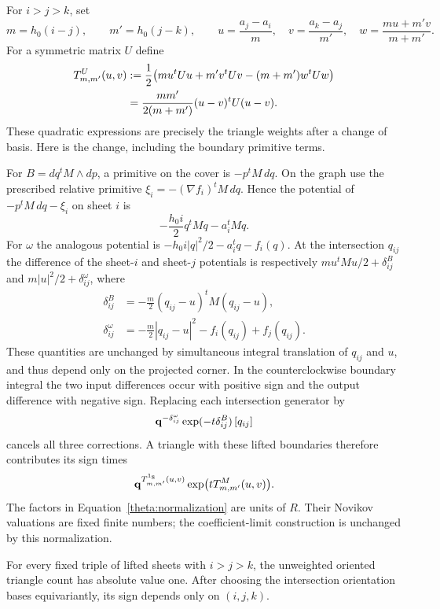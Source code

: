 For $i>j>k$, set
\[
 m=h_0(i-j),\qquad m'=h_0(j-k),\qquad
 u=\frac{a_j-a_i}{m},\quad v=\frac{a_k-a_j}{m'},\quad
 w=\frac{mu+m'v}{m+m'}.
\]
For a symmetric matrix $U$ define
\begin{align}
 T^U_{m,m'}(u,v)
 &:=\frac12\bigl(mu^tUu+m'v^tUv-(m+m')w^tUw\bigr)\notag\\
 &=\frac{mm'}{2(m+m')}(u-v)^tU(u-v).
 \label{theta:quadratic}
\end{align}
These quadratic expressions are precisely the triangle weights after a
change of basis.  Here is the change, including the boundary primitive
terms.

For $B=dq^tM\wedge dp$, a primitive on the cover is $-p^tM\,dq$.
On the graph use the prescribed relative primitive
$\xi_i=-(\nabla f_i)^tM\,dq$.  Hence the potential of
$-p^tM\,dq-\xi_i$ on sheet $i$ is
\[
 -\frac{h_0i}{2}q^tMq-a_i^tMq.
\]
For $\omega$ the analogous potential is
$-h_0i|q|^2/2-a_i^tq-f_i(q)$.  At the intersection $q_{ij}$ the difference
of the sheet-$i$ and sheet-$j$ potentials is respectively
$mu^tMu/2+\delta^B_{ij}$ and $m|u|^2/2+\delta^\omega_{ij}$, where
\begin{equation}\label{theta:corner-corrections}
 \begin{split}
 \delta^B_{ij}&=-\frac m2(q_{ij}-u)^tM(q_{ij}-u),\\
 \delta^\omega_{ij}&=-\frac m2|q_{ij}-u|^2-f_i(q_{ij})+f_j(q_{ij}).
 \end{split}
\end{equation}
These quantities are unchanged by simultaneous integral translation of
$q_{ij}$ and $u$, and thus depend only on the projected corner.  In the
counterclockwise boundary integral the two input differences occur with
positive sign and the output difference with negative sign.  Replacing
each intersection generator by
\begin{equation}\label{theta:normalization}
 \mathbf q^{-\delta^\omega_{ij}}
       \exp(-t\delta^B_{ij})\, [q_{ij}]
\end{equation}
cancels all three corrections.  A triangle with these lifted boundaries
therefore contributes its sign times
\[
 \mathbf q^{T^{1_8}_{m,m'}(u,v)}
       \exp\bigl(tT^M_{m,m'}(u,v)\bigr).
\]
The factors in Equation~\eqref{theta:normalization} are units of $R$.
Their Novikov valuations are fixed finite numbers; the coefficient-limit
construction is unchanged by this normalization.

\begin{lemma}\label{theta:triangle-count}
For every fixed triple of lifted sheets with $i>j>k$, the unweighted
oriented triangle count has absolute value one.  After choosing the
intersection orientation bases equivariantly, its sign depends only on
$(i,j,k)$.
\end{lemma}

